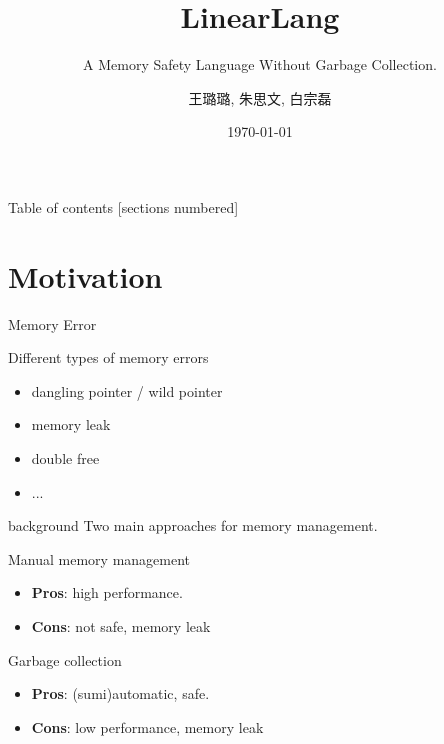 \documentclass[10pt]{beamer}
\title{LinearLang}
\subtitle{A Memory Safety Language Without Garbage Collection.}
\date{\today}
\author{王璐璐, 朱思文, 白宗磊}
\institute{Peking University}
\begin{document}
\maketitle


\begin{frame}{Table of contents}
  [sections numbered]
  \tableofcontents[hideallsubsections]
\end{frame}



\section{Motivation}

\begin{frame}[fragile]{Memory Error}
	\begin{block}{Different types of memory errors}
		\begin{itemize}
			\item dangling pointer / wild pointer
			\item memory leak
			\item double free
			\item ...
		\end{itemize}
	\end{block}
\end{frame}


\begin{frame}[fragile]{background}
  Two main approaches for memory management.


      \begin{exampleblock}{Manual memory management}
      	\begin{itemize}
      		\item \textbf{Pros}: high performance. 
      		\item \textbf{Cons}: not safe, memory leak
      	\end{itemize}
      \end{exampleblock}


      \begin{exampleblock}{Garbage collection}
      	\begin{itemize}
      		\item \textbf{Pros}: (sumi)automatic, safe. 
      		\item \textbf{Cons}: low performance, memory leak
      	\end{itemize}
      \end{exampleblock}
\end{frame}
\end{document}
